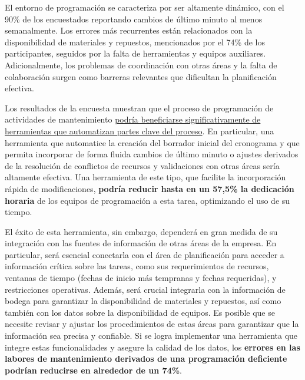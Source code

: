 \documentclass{article}
\begin{document}
\begin{appendix}
    El entorno de programación se caracteriza por ser altamente dinámico, con el 90\% de los encuestados reportando cambios de último minuto al menos semanalmente. Los errores más recurrentes están relacionados con la disponibilidad de materiales y repuestos, mencionados por el 74\% de los participantes, seguidos por la falta de herramientas y equipos auxiliares. Adicionalmente, los problemas de coordinación con otras áreas y la falta de colaboración surgen como barreras relevantes que dificultan la planificación efectiva.
    
    Los resultados de la encuesta muestran que el proceso de programación de actividades de mantenimiento \uline{podría beneficiarse significativamente de herramientas que automatizan partes clave del proceso}. En particular, una herramienta que automatice la creación del borrador inicial del cronograma y que permita incorporar de forma fluida cambios de último minuto o ajustes derivados de la resolución de conflictos de recursos y validaciones con otras áreas sería altamente efectiva. Una herramienta de este tipo, que facilite la incorporación rápida de modificaciones, \textbf{podría reducir hasta en un 57,5\% la dedicación horaria} de los equipos de programación a esta tarea, optimizando el uso de su tiempo.
    
    El éxito de esta herramienta, sin embargo, dependerá en gran medida de su integración con las fuentes de información de otras áreas de la empresa. En particular, será esencial conectarla con el área de planificación para acceder a información crítica sobre las tareas, como sus requerimientos de recursos, ventanas de tiempo (fechas de inicio más tempranas y fechas requeridas), y restricciones operativas. Además, será crucial integrarla con la información de bodega para garantizar la disponibilidad de materiales y repuestos, así como también con los datos sobre la disponibilidad de equipos. Es posible que se necesite revisar y ajustar los procedimientos de estas áreas para garantizar que la información sea precisa y confiable. Si se logra implementar una herramienta que integre estas funcionalidades y asegure la calidad de los datos, los \textbf{errores en las labores de mantenimiento derivados de una programación deficiente podrían reducirse en alrededor de un 74\%}.
    
    
\end{appendix}

\printbibliography
\end{document}
